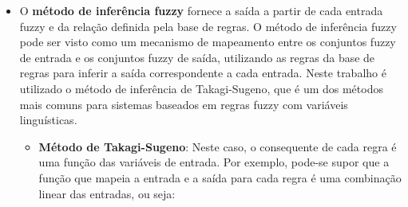 \begin{itemize}
    \item O \textbf{método de inferência fuzzy} fornece a saída a partir de cada entrada fuzzy e da relação definida pela base de regras. O método de inferência fuzzy pode ser visto como um mecanismo de mapeamento entre os conjuntos fuzzy de entrada e os conjuntos fuzzy de saída, utilizando as regras da base de regras para inferir a saída correspondente a cada entrada. Neste trabalho é utilizado o método de inferência de Takagi-Sugeno, que é um dos métodos mais comuns para sistemas baseados em regras fuzzy com variáveis linguísticas.
        \begin{itemize}
        \item \textbf{Método de Takagi-Sugeno}: Neste caso, o consequente de cada regra é uma função das variáveis de entrada. Por exemplo, pode-se supor que a função que mapeia a entrada e a saída para cada regra é uma combinação linear das entradas, ou seja: 

\end{itemize}
\end{itemize}
